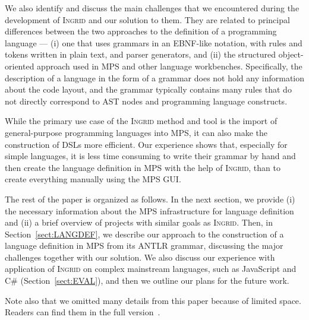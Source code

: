 We also identify and discuss the main challenges that we encountered during the development of \textsc{Ingrid} and our solution to them.
They are related to principal differences between the two approaches to the definition of a programming language --- (i) one that uses grammars in an EBNF-like notation, with rules and tokens written in plain text, and parser generators, and (ii) the structured object-oriented approach used in MPS and other language workbenches.
Specifically, the description of a language in the form of a grammar does not hold any information about the code layout, and the grammar typically contains many rules that do not directly correspond to AST nodes and programming language constructs.

While the primary use case of the \textsc{Ingrid} method and tool is the import of general-purpose programming languages into MPS, it can also make the construction of DSLs more efficient.
Our experience shows that, especially for simple languages, it is less time consuming to write their grammar by hand and then create the language definition in MPS with the help of \textsc{Ingrid}, than to create everything manually using the MPS GUI.

The rest of the paper is organized as follows.
In the next section, we provide (i) the necessary information about the MPS infrastructure for language definition and (ii) a brief overview of projects with similar goals as \textsc{Ingrid}.
Then, in Section~\ref{sect:LANGDEF}, we describe our approach to the construction of a language definition in MPS from its ANTLR grammar, discussing the major challenges together with our solution.
We also discuss our experience with application of \textsc{Ingrid} on complex mainstream languages, such as JavaScript and C\# (Section~\ref{sect:EVAL}), and then we outline our plans for the future work.

Note also that we omitted many details from this paper because of limited space.
Readers can find them in the full version~\cite{ref:TRFULL}.

